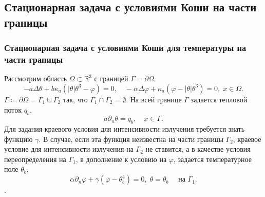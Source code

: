 \subsection{Стационарная задача с условиями Коши на части границы}\label{subsec:st-koshi}
\begin{frame}
    \frametitle{Стационарная задача с условиями Коши для температуры на части границы}
    Рассмотрим область $\Omega\subset \mathbb{R}^3$ с границей $\Gamma=\partial\Omega$.
    \begin{equation}
        \label{eq:2_4:eq1}
        - a\Delta\theta + b\kappa_a(|\theta|\theta^3- \varphi)=0,   \quad
        -\alpha \Delta \varphi + \kappa_a(\varphi-|\theta|\theta^3)=0,\; x\in\Omega.
    \end{equation}
    $\Gamma \coloneqq \partial \Omega =\overline{\Gamma}_1 \cup \overline{\Gamma}_2$
    так, что $\Gamma_1 \cap \Gamma_2 =  \emptyset$.
    На всей границе $\Gamma$ задается тепловой поток $q_b$,
    \begin{equation}
        \label{eq:2_4:bc1}
        a\partial_n\theta = q_b, \quad x\in \Gamma.
    \end{equation}
    Для задания краевого условия для интенсивности излучения требуется знать функцию $\gamma$.
    В случае, если эта функция неизвестна на части границы $\Gamma_2$,
    краевое условие для интенсивности излучения на $\Gamma_2$ не ставится, а в качестве условия
    переопределения на $\Gamma_1$, в дополнение к условию на
    $\varphi$, задается температурное поле $\theta_b$,
    \begin{equation}
        \label{eq:2_4:bc2}
        \alpha\partial_n\varphi + \gamma (\varphi - \theta_b ^4 ) = 0,\;
        \theta=\theta_b\quad \text{ на } \Gamma_1.
    \end{equation}.


\end{frame}

